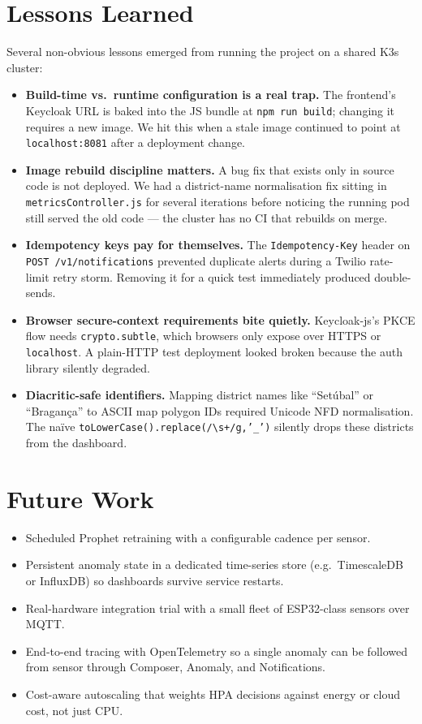 \documentclass[12pt,a4paper,oneside]{report}
\begin{document}
\section{Lessons Learned}

Several non-obvious lessons emerged from running the project on a shared K3s cluster:

\begin{itemize}
  \item \textbf{Build-time vs.\ runtime configuration is a real trap.} The frontend's Keycloak URL is baked into the JS bundle at \texttt{npm run build}; changing it requires a new image. We hit this when a stale image continued to point at \texttt{localhost:8081} after a deployment change.
  \item \textbf{Image rebuild discipline matters.} A bug fix that exists only in source code is not deployed. We had a district-name normalisation fix sitting in \texttt{metricsController.js} for several iterations before noticing the running pod still served the old code — the cluster has no CI that rebuilds on merge.
  \item \textbf{Idempotency keys pay for themselves.} The \texttt{Idempotency-Key} header on \texttt{POST /v1/notifications} prevented duplicate alerts during a Twilio rate-limit retry storm. Removing it for a quick test immediately produced double-sends.
  \item \textbf{Browser secure-context requirements bite quietly.} Keycloak-js's PKCE flow needs \texttt{crypto.subtle}, which browsers only expose over HTTPS or \texttt{localhost}. A plain-HTTP test deployment looked broken because the auth library silently degraded.
  \item \textbf{Diacritic-safe identifiers.} Mapping district names like ``Setúbal'' or ``Bragança'' to ASCII map polygon IDs required Unicode NFD normalisation. The naïve \texttt{toLowerCase().replace(/\textbackslash s+/g,'\_')} silently drops these districts from the dashboard.
\end{itemize}

\section{Future Work}

\begin{itemize}
  \item Scheduled Prophet retraining with a configurable cadence per sensor.
  \item Persistent anomaly state in a dedicated time-series store (e.g.\ TimescaleDB or InfluxDB) so dashboards survive service restarts.
  \item Real-hardware integration trial with a small fleet of ESP32-class sensors over MQTT.
  \item End-to-end tracing with OpenTelemetry so a single anomaly can be followed from sensor through Composer, Anomaly, and Notifications.
  \item Cost-aware autoscaling that weights HPA decisions against energy or cloud cost, not just CPU.
\end{itemize}
\end{document}
